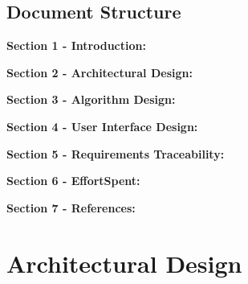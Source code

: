 \documentclass[a4paper]{article}
\begin{document}
\subsection{Document Structure}
\begin{description}
\item \textbf{Section 1 - Introduction:}
\item \textbf{Section 2 - Architectural Design:}
\item \textbf{Section 3 - Algorithm Design:}
\item \textbf{Section 4 - User Interface Design:}
\item \textbf{Section 5 - Requirements Traceability:}
\item \textbf{Section 6 - EffortSpent:}
\item \textbf{Section 7 - References:}
\end{description}

\newpage
\section{Architectural Design}
\end{document}
